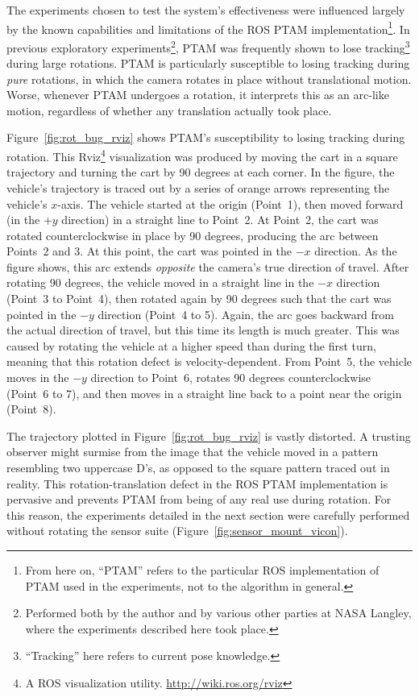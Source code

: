 The experiments chosen to test the system's effectiveness were influenced largely by the known capabilities and limitations of the ROS PTAM implementation\footnote{From here on, ``PTAM'' refers to the particular ROS implementation of PTAM used in the experiments, not to the algorithm in general.}. In previous exploratory experiments\footnote{Performed both by the author and by various other parties at NASA Langley, where the experiments described here took place.}, PTAM was frequently shown to lose tracking\footnote{``Tracking'' here refers to current pose knowledge.} during large rotations. PTAM is particularly susceptible to losing tracking during \textit{pure} rotations, in which the camera rotates in place without translational motion. Worse, whenever PTAM undergoes a rotation, it interprets this as an arc-like motion, regardless of whether any translation actually took place.

Figure~\ref{fig:rot_bug_rviz} shows PTAM's susceptibility to losing tracking during rotation. This Rviz\footnote{A ROS visualization utility. \url{http://wiki.ros.org/rviz}} visualization was produced by moving the cart in a square trajectory and turning the cart by 90 degrees at each corner. In the figure, the vehicle's trajectory is traced out by a series of orange arrows representing the vehicle's $x$-axis. The vehicle started at the origin (Point~1), then moved forward (in the $+y$ direction) in a straight line to Point~2. At Point~2, the cart was rotated counterclockwise in place by 90 degrees, producing the arc between Points~2 and 3. At this point, the cart was pointed in the $-x$ direction. As the figure shows, this arc extends \textit{opposite} the camera's true direction of travel. After rotating 90 degrees, the vehicle moved in a straight line in the $-x$ direction (Point~3 to Point~4), then rotated again by 90 degrees such that the cart was pointed in the $-y$ direction (Point~4 to 5). Again, the arc goes backward from the actual direction of travel, but this time its length is much greater. This was caused by rotating the vehicle at a higher speed than during the first turn, meaning that this rotation defect is velocity-dependent. From Point~5, the vehicle moves in the $-y$ direction to Point~6, rotates 90 degrees counterclockwise (Point~6 to 7), and then moves in a straight line back to a point near the origin (Point~8).

The trajectory plotted in Figure~\ref{fig:rot_bug_rviz} is vastly distorted. A trusting observer might surmise from the image that the vehicle moved in a pattern resembling two uppercase D's, as opposed to the square pattern traced out in reality. This rotation-translation defect in the ROS PTAM implementation is pervasive and prevents PTAM from being of any real use during rotation. For this reason, the experiments detailed in the next section were carefully performed without rotating the sensor suite (Figure~\ref{fig:sensor_mount_vicon}).

